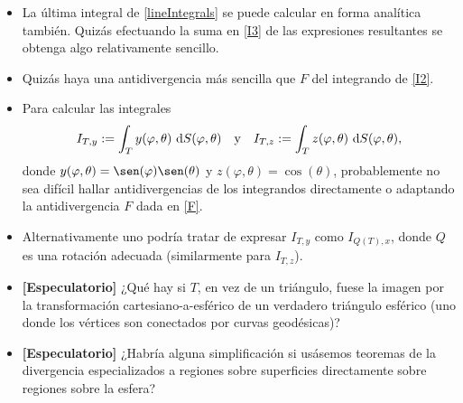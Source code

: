 \documentclass[reqno]{amsart}
\newcommand{\dd}[1][y]{\if#1y\,\fi{\mathrm d}} %
\begin{document}
\begin{itemize}[leftmargin=*]
\item La última integral de \eqref{lineIntegrals} se puede calcular en forma analítica también.
Quizás efectuando la suma en \eqref{I3} de las expresiones resultantes se obtenga algo relativamente sencillo.
\item Quizás haya una antidivergencia más sencilla que $F$ del integrando de \eqref{I2}.
\item Para calcular las integrales
%
\begin{equation*}
I_{T,y} := \int_T y(\varphi, \theta) \, \dd S(\varphi, \theta)
\quad\text{y}\quad
I_{T,z} := \int_T z(\varphi, \theta) \, \dd S(\varphi, \theta),
\end{equation*}
%
donde $y(\varphi, \theta) = \sen(\varphi) \sen(\theta)$ y $z(\varphi, \theta) = \cos(\theta)$, probablemente no sea difícil hallar antidivergencias de los integrandos directamente o adaptando la antidivergencia $F$ dada en \eqref{F}.
\item Alternativamente uno podría tratar de expresar $I_{T,y}$ como $I_{Q(T),x}$, donde $Q$ es una rotación adecuada (similarmente para $I_{T,z}$).
\item \textbf{[Especulatorio]} ¿Qué hay si $T$, en vez de un triángulo, fuese la imagen por la transformación cartesiano-a-esférico de un verdadero triángulo esférico (uno donde los vértices son conectados por curvas geodésicas)?
\item \textbf{[Especulatorio]} ¿Habría alguna simplificación si usásemos teoremas de la divergencia especializados a regiones sobre superficies directamente sobre regiones sobre la esfera?
\end{itemize}
\end{document}
